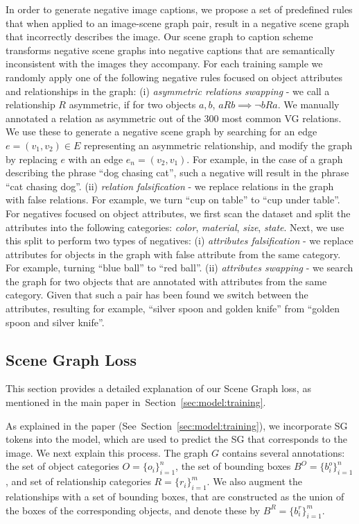 \documentclass[11pt]{article}
\def\Secref#1{Section~\ref{#1}}
\def\Secref#1{Section~\ref{#1}}
\begin{document}
In order to generate negative image captions, we propose a set of predefined rules that when applied to an image-scene graph pair, result in a negative scene graph that incorrectly describes the image. Our scene graph to caption scheme transforms negative scene graphs into negative captions that are semantically inconsistent with the images they accompany. For each training sample we randomly apply one of the following negative rules focused on object attributes and relationships in the graph: (i) \textit{asymmetric relations swapping}  - we call a relationship $R$ asymmetric, if for two objects $a,b$, $aRb \implies \neg bRa$. We manually annotated a relation as asymmetric out of the $300$ most common VG relations. We use these to generate a negative scene graph by searching for an edge $e = (v_1,v_2) \in E$ representing an asymmetric relationship, and modify the graph by replacing $e$ with an edge $e_n = (v_2,v_1)$. For example, in the case of a graph describing the phrase ``dog chasing cat'', such a negative will result in the phrase ``cat chasing dog''. (ii) \textit{relation falsification} - we replace relations in the graph with false relations. For example, we turn ``cup on table'' to ``cup under table''. For negatives focused on object attributes, we first scan the dataset and split the attributes into the following categories: \emph{color}, \emph{material}, \emph{size}, \emph{state}. Next, we use this split to perform two types of negatives: (i) \textit{attributes falsification} - we replace attributes for objects in the graph with false attribute from the same category. For example, turning ``blue ball'' to ``red ball''. (ii) \textit{attributes swapping} - we search the graph for two objects that are annotated with attributes from the same category. Given that such a pair has been found we switch between the attributes, resulting for example, ``silver spoon and golden knife'' from ``golden spoon and silver knife''. 





\subsection{Scene Graph Loss} 
\label{supp:models:sg_loss}

This section provides a detailed explanation of our Scene Graph loss, as mentioned in the main paper in~\Secref{sec:model:training}.

As explained in the paper (See~\Secref{sec:model:training}), we incorporate SG tokens into the model, which are used to predict the SG that corresponds to the image. We next explain this process. The graph $G$ contains several annotations: the set of object categories $O = \{o_i\}_{i=1}^{n}$, the set of bounding boxes $B^O = \{b^o_i\}_{i=1}^n$, and set of relationship categories $R = \{r_i\}_{i=1}^m$. We also augment the relationships with a set of bounding boxes, that are constructed as the union of the boxes of the corresponding objects, and denote these by $B^R = \{b^r_i\}_{i=1}^m$. 
\end{document}
